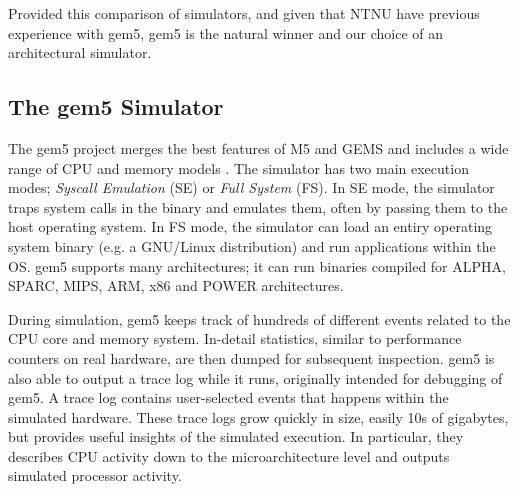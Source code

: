 Provided this comparison of simulators, and given that NTNU have previous
experience with gem5, gem5 is the natural winner and our choice of an
architectural simulator.


\subsection{The gem5 Simulator}

The gem5 project \cite{gem5} merges the best features of M5 \cite{binkert2006m5}
and GEMS \cite{GEMS} and includes a wide range of CPU and memory models
\cite{gem5hipeac}. The simulator has two main execution modes; \textit{Syscall
Emulation} (SE) or \textit{Full System} (FS). In SE mode, the simulator traps
system calls in the binary and emulates them, often by passing them to the host
operating system. In FS mode, the simulator can load an entiry operating system
binary (e.g. a GNU/Linux distribution) and run applications within the OS. gem5
supports many architectures; it can run binaries compiled for ALPHA, SPARC,
MIPS, ARM, x86 and POWER architectures.

During simulation, gem5 keeps track of hundreds of different events related to
the CPU core and memory system. In-detail statistics, similar to performance
counters on real hardware, are then dumped for subsequent inspection. gem5 is
also able to output a trace log while it runs, originally intended for debugging
of gem5. A trace log contains user-selected events that happens within the
simulated hardware. These trace logs grow quickly in size, easily 10s of
gigabytes, but provides useful insights of the simulated execution. In
particular, they describes CPU activity down to the microarchitecture level and
outputs simulated processor activity.

